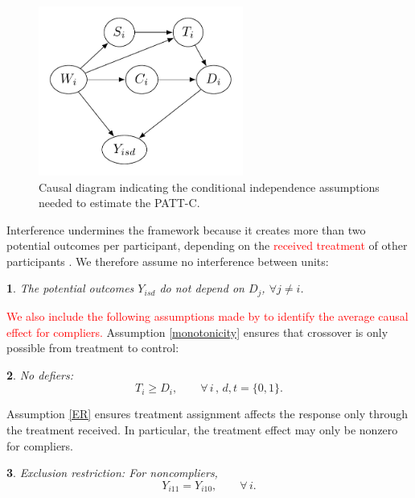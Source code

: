 \documentclass[hidelinks,12pt]{article}
\makeatletter
\newtheorem*{assumption*}{\assumptionnumber}
\providecommand{\assumptionnumber}{}
\newenvironment{assumption}[2]
 {%
  \renewcommand{\assumptionnumber}{Assumption #1}%
  \begin{assumption*}%
  \protected@edef\@currentlabel{#1}%
 }
 {%
  \end{assumption*}
 }
\makeatother
\begin{document}
\begin{figure}[htb]
	\begin{center}
		\includegraphics[width = 0.6\textwidth]{DAG2.png}
		\caption{Causal diagram indicating the conditional independence assumptions needed to estimate the PATT-C.\label{fig:DAG}}
	\end{center}
\end{figure}

Interference undermines the framework because it creates more than two potential outcomes per participant, depending on the \textcolor{red}{received treatment} of other participants \citep{rubin1990}. We therefore assume no interference between units: 

\vskip 0.2in
\begin{assumption}{5}{}\label{sutva}
	The potential outcomes $Y_{isd}$ do not depend on $D_j$, $\forall j\neq i$. 
\end{assumption} 

\textcolor{red}{We also include the following assumptions made by \citet{Angrist1996} to identify the average
causal effect for compliers.} Assumption \eqref{monotonicity} ensures that crossover is only possible from treatment to control:

\vskip 0.2in
\begin{assumption}{6}{}\label{monotonicity}
No defiers: 
\begin{equation*}
T_i \geq D_i, \qquad \forall \, i \, , \, d, t=\{0,1\}.
\end{equation*}
\end{assumption}
\noindent
Assumption \eqref{ER} ensures treatment assignment affects the response only through the treatment received. In particular, the treatment effect may only be nonzero for compliers.

\begin{assumption}{7}{}\label{ER}
Exclusion restriction: For noncompliers,
\begin{equation*}
Y_{i11} = Y_{i10}, \qquad \forall \, i.
\end{equation*}  
\end{assumption}
\end{document}
